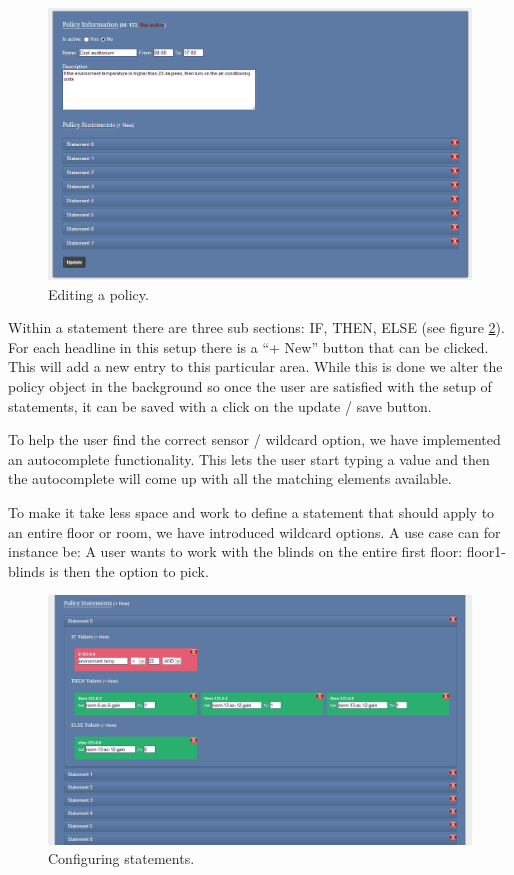 \begin{figure}[ht]
\centering
\includegraphics[width=\columnwidth]{policy.png}
\caption{Editing a policy.}
\label{fig:policy}
\end{figure}

Within a statement there are three sub sections: IF, THEN, ELSE (see figure \ref{fig:statement}). For each headline in this setup there is a "`+ New"' button that can be clicked. This will add a new entry to this particular area. While this is done we alter the policy object in the background so once the user are satisfied with the setup of statements, it can be saved with a click on the update / save button.

To help the user find the correct sensor / wildcard option, we have implemented an autocomplete functionality. This lets the user start typing a value and then the autocomplete will come up with all the matching elements available.

To make it take less space and work to define a statement that should apply to an entire floor or room, we have introduced wildcard options. A use case can for instance be: A user wants to work with the blinds on the entire first floor: floor1-blinds is then the option to pick.

\begin{figure}[ht]
\centering
\includegraphics[width=\columnwidth]{statement.png}
\caption{Configuring statements.}
\label{fig:statement}
\end{figure}

